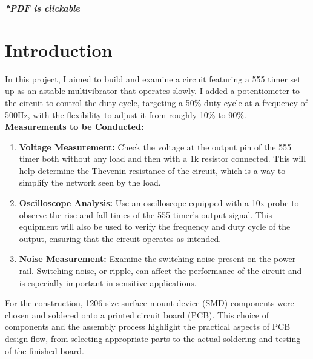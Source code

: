 \documentclass[a4paper,11pt]{article}%
\begin{document}


\pagebreak

\tableofcontents
\listoffigures
\listoftables
\vfill
\begin{center}
	\textbf{\textit{*PDF is clickable}}
\end{center}

\pagebreak

\section{Introduction}

In this project, I aimed to build and examine a circuit featuring a 555 timer set up as an astable multivibrator that operates slowly. I added a potentiometer to the circuit to control the duty cycle, targeting a 50\% duty cycle at a frequency of 500Hz, with the flexibility to adjust it from roughly 10\% to 90\%.\\

\textbf{Measurements to be Conducted:}

\begin{enumerate}
	\item \textbf{Voltage Measurement:} Check the voltage at the output pin of the 555 timer both without any load and then with a 1k resistor connected. This will help determine the Thevenin resistance of the circuit, which is a way to simplify the network seen by the load.
	\item \textbf{Oscilloscope Analysis:} Use an oscilloscope equipped with a 10x probe to observe the rise and fall times of the 555 timer's output signal. This equipment will also be used to verify the frequency and duty cycle of the output, ensuring that the circuit operates as intended.
	\item \textbf{Noise Measurement:} Examine the switching noise present on the power rail. Switching noise, or ripple, can affect the performance of the circuit and is especially important in sensitive applications.
\end{enumerate}

For the construction, 1206 size surface-mount device (SMD) components were chosen and soldered onto a printed circuit board (PCB). This choice of components and the assembly process highlight the practical aspects of PCB design flow, from selecting appropriate parts to the actual soldering and testing of the finished board.
\end{document}
